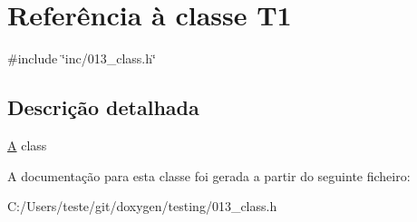 \hypertarget{class_t1}{\section{Referência à classe T1}
\label{class_t1}
}


{\ttfamily \#include \char`\"{}inc/013\-\_\-class.\-h\char`\"{}}



\subsection{Descrição detalhada}
\hyperlink{class_a}{A} class 

A documentação para esta classe foi gerada a partir do seguinte ficheiro\-:\begin{DoxyCompactItemize}
\item 
C\-:/\-Users/teste/git/doxygen/testing/013\-\_\-class.\-h\end{DoxyCompactItemize}
